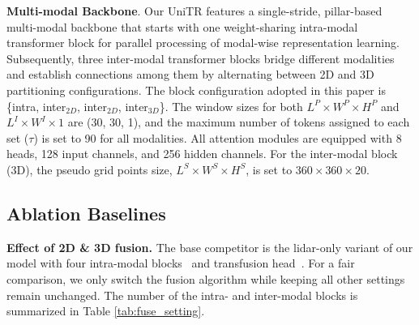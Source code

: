 \documentclass[10pt,twocolumn,letterpaper]{article}
\begin{document}
\noindent \textbf{Multi-modal Backbone}. Our UniTR features a single-stride, pillar-based multi-modal backbone that starts with one weight-sharing intra-modal transformer block for parallel processing of modal-wise representation learning. Subsequently, three inter-modal transformer blocks bridge different modalities and establish connections among them by alternating between 2D and 3D partitioning configurations. The block configuration adopted in this paper is \{intra, inter$_{2D}$, inter$_{2D}$, inter$_{3D}$\}. The window sizes for both $L^P \times W^P \times H^P$ and $L^I \times W^I \times 1$ are (30, 30, 1), and the maximum number of tokens assigned to each set ($\tau$) is set to 90 for all modalities. All attention modules are equipped with 8 heads, 128 input channels, and 256 hidden channels. For the inter-modal block (3D), the pseudo grid points size, $L^S \times W^S \times H^S$, is set to $360 \times 360 \times 20$.

\subsection{Ablation Baselines}
\noindent \textbf{Effect of 2D \& 3D fusion.} The base competitor is the lidar-only variant of our model with four intra-modal blocks~\cite{wang2023dsvt} and transfusion head~\cite{bai2022transfusion}. For a fair comparison, we only switch the fusion algorithm while keeping all other settings remain unchanged. The number of the intra- and inter-modal blocks is summarized in Table \ref{tab:fuse_setting}.

\begin{table}[h]
\centering
{}
\vspace{-4pt}
\caption{The number of the intra- and inter-modal blocks on the ablation of 2D \& 3D fusion. Camera~(C), LiDAR~(L).}
\label{tab:fuse_setting}
\vspace{-4pt}
\end{table}
\end{document}
